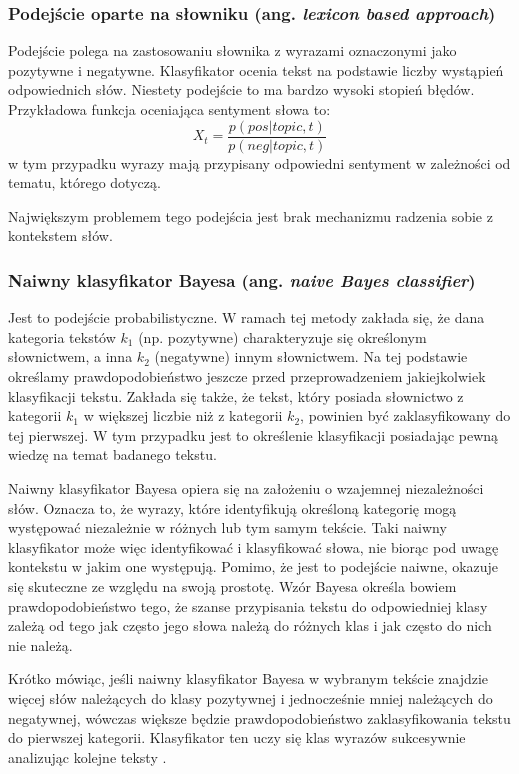 \subsubsection{Podejście oparte na słowniku (ang. \textit{lexicon based approach})}
Podejście polega na zastosowaniu słownika z wyrazami oznaczonymi jako pozytywne
i negatywne. Klasyfikator ocenia tekst na podstawie liczby wystąpień
odpowiednich słów. Niestety podejście to ma bardzo wysoki stopień błędów.
Przykładowa funkcja oceniająca sentyment słowa to:
\begin{equation}
X_t = \frac{p(pos | topic, t)}{p(neg | topic, t)}
\end{equation}
w tym przypadku wyrazy mają przypisany odpowiedni sentyment w zależności od tematu,
którego dotyczą.

Największym problemem tego podejścia jest brak mechanizmu radzenia sobie z kontekstem
słów.

\subsubsection{Naiwny klasyfikator Bayesa (ang. \textit{naive Bayes classifier})}
Jest to podejście probabilistyczne. W ramach tej metody zakłada się, że dana kategoria
tekstów $k_1$ (np. pozytywne) charakteryzuje się określonym słownictwem, 
a inna $k_2$ (negatywne) innym słownictwem. 
Na tej podstawie określamy prawdopodobieństwo jeszcze przed przeprowadzeniem
jakiejkolwiek klasyfikacji tekstu. Zakłada się także, że tekst, który posiada
słownictwo z kategorii $k_1$ w większej liczbie niż z kategorii $k_2$, powinien
być zaklasyfikowany do tej pierwszej. 
W tym przypadku jest to określenie klasyfikacji posiadając pewną wiedzę na temat
badanego tekstu.

Naiwny klasyfikator Bayesa opiera się na założeniu o wzajemnej niezależności
słów. Oznacza to, że wyrazy, które identyfikują określoną kategorię mogą występować
niezależnie w różnych lub tym samym tekście. Taki naiwny klasyfikator może więc 
identyfikować i klasyfikować słowa, nie biorąc pod uwagę kontekstu w jakim one
występują. Pomimo, że jest to podejście naiwne, okazuje się skuteczne ze względu
na swoją prostotę. Wzór Bayesa określa bowiem prawdopodobieństwo tego, że szanse
przypisania tekstu do odpowiedniej klasy zależą od tego jak często jego słowa
należą do różnych klas i jak często do nich nie należą.

Krótko mówiąc, jeśli naiwny klasyfikator Bayesa w wybranym tekście znajdzie więcej
słów należących do klasy pozytywnej i jednocześnie mniej należących do negatywnej,
wówczas większe będzie prawdopodobieństwo zaklasyfikowania tekstu do pierwszej
kategorii. Klasyfikator ten uczy się klas wyrazów sukcesywnie analizując
kolejne teksty \cite{tomanekSentyment}.



